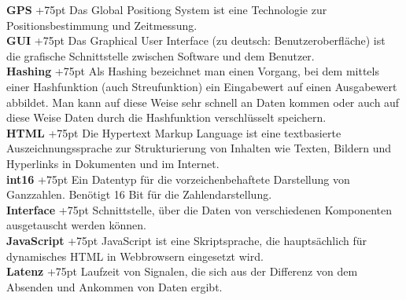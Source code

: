 \documentclass[fontsize = 12pt, paper = a4]{scrreprt}
\begin{document}
\textbf{GPS}
\hangindent+75pt 
\hspace*{14mm}
Das Global Positiong System ist eine Technologie zur Positionsbestimmung und Zeitmessung.\\

\textbf{GUI}
\hangindent+75pt 
\hspace*{14.5mm}
Das Graphical User Interface (zu deutsch: Benutzeroberfläche) ist die grafische Schnittstelle zwischen Software und dem Benutzer.\\

\textbf{Hashing}
\hangindent+75pt   
\hspace*{6.5mm}
Als Hashing bezeichnet man einen Vorgang, bei dem mittels einer Hashfunktion (auch Streufunktion) ein Eingabewert auf einen Ausgabewert abbildet. Man kann auf diese Weise sehr schnell an Daten kommen oder auch auf diese Weise Daten durch die Hashfunktion verschlüsselt speichern.\\

\textbf{HTML}
\hangindent+75pt 
\hspace*{9mm}
Die Hypertext Markup Language ist eine textbasierte Auszeichnungssprache zur Strukturierung von Inhalten wie Texten, Bildern und Hyperlinks in Dokumenten und im Internet.\\

\textbf{int16}
\hangindent+75pt 
\hspace*{12mm}
Ein Datentyp für die vorzeichenbehaftete Darstellung von Ganzzahlen. Benötigt 16 Bit für die Zahlendarstellung.\\

\textbf{Interface}
\hangindent+75pt 
\hspace*{6mm}
Schnittstelle, über die Daten von verschiedenen Komponenten ausgetauscht werden können.\\

\textbf{JavaScript}
\hangindent+75pt 
\hspace*{2.5mm}
JavaScript ist eine Skriptsprache, die hauptsächlich für dynamisches HTML in Webbrowsern eingesetzt wird. \\

\textbf{Latenz}
\hangindent+75pt 
\hspace*{10mm}
Laufzeit von Signalen, die sich aus der Differenz von dem Absenden und Ankommen von Daten ergibt.\\


\newpage
\end{document}
